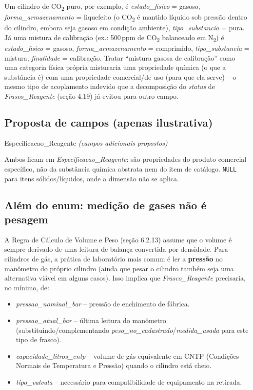 Um cilindro de CO\textsubscript{2} puro, por exemplo, é \textit{estado\_fisico} = gasoso, \textit{forma\_armazenamento} = liquefeito (o CO\textsubscript{2} é mantido líquido sob pressão dentro do cilindro, embora seja gasoso em condição ambiente), \textit{tipo\_substancia} = pura. Já uma mistura de calibração (ex.: 500\,ppm de CO\textsubscript{2} balanceado em N\textsubscript{2}) é \textit{estado\_fisico} = gasoso, \textit{forma\_armazenamento} = comprimido, \textit{tipo\_substancia} = mistura, \textit{finalidade} = calibração. Tratar ``mistura gasosa de calibração'' como uma categoria física própria misturaria uma propriedade química (o que a substância é) com uma propriedade comercial/de uso (para que ela serve) -- o mesmo tipo de acoplamento indevido que a decomposição do \textit{status} de \textit{Frasco\_Reagente} (seção 4.19) já evitou para outro campo.

\subsection{Proposta de campos (apenas ilustrativa)}

\begin{entidade}{Especificacao\_Reagente \textit{(campos adicionais propostos)}}
\end{entidade}

Ambos ficam em \textit{Especificacao\_Reagente}: são propriedades do produto comercial específico, não da substância química abstrata nem do item de catálogo. \texttt{NULL} para itens sólidos/líquidos, onde a dimensão não se aplica.

\subsection{Além do enum: medição de gases não é pesagem}

A Regra de Cálculo de Volume e Peso (seção 6.2.13) assume que o volume é sempre derivado de uma leitura de balança convertida por densidade. Para cilindros de gás, a prática de laboratório mais comum é ler a \textbf{pressão} no manômetro do próprio cilindro (ainda que pesar o cilindro também seja uma alternativa viável em alguns casos). Isso implica que \textit{Frasco\_Reagente} precisaria, no mínimo, de:

\begin{itemize}
    \item \textit{pressao\_nominal\_bar} -- pressão de enchimento de fábrica.
    \item \textit{pressao\_atual\_bar} -- última leitura do manômetro (substituindo/complementando \textit{peso\_no\_cadastrado}/\textit{medida\_usada} para este tipo de frasco).
    \item \textit{capacidade\_litros\_cntp} -- volume de gás equivalente em CNTP (Condições Normais de Temperatura e Pressão) quando o cilindro está cheio.
    \item \textit{tipo\_valvula} -- necessário para compatibilidade de equipamento na retirada.
\end{itemize}


